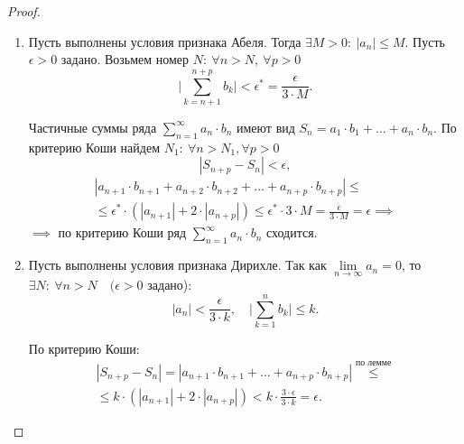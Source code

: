\begin{proof}\leavevmode
    \begin{enumerate}
        \item Пусть выполнены условия признака Абеля. Тогда $\exists M > 0: \ |a_n| \leqslant M$. Пусть $\epsilon > 0$ задано. Возьмем номер $N: \ \forall n > N, \ \forall p > 0$
              \[
                \bigg|\sum_{k=n+1}^{n+p}b_k\bigg| < \epsilon^* = \frac{\epsilon}{3\cdot M}.
              \]

              Частичные суммы ряда $\sum_{n=1}^{\infty}a_n\cdot b_n$ имеют вид $S_n = a_1\cdot b_1 + \ldots + a_n \cdot b_n$. По критерию Коши найдем $N_1: \ \forall n > N_1, \forall p > 0$
              \[
                |S_{n+p} - S_n| < \epsilon,
              \]
              \begin{multline*}
                  |a_{n+1} \cdot b_{n+1} + a_{n+2} \cdot b_{n+2} + \ldots + a_{n+p} \cdot b_{n+p}| \leqslant \\
                  \leqslant \epsilon^* \cdot (|a_{n+1}| + 2 \cdot |a_{n+p}|) \leqslant \epsilon^* \cdot 3 \cdot M = \frac{\epsilon}{3 \cdot M} = \epsilon \implies
              \end{multline*}
              $\implies$ по критерию Коши ряд $\sum_{n=1}^{\infty}a_n \cdot b_n$ сходится.

        \item Пусть выполнены условия признака Дирихле. Так как $\underset{n\rightarrow\infty}{\lim}a_n = 0$, то $\exists N: \ \forall n > N \quad (\epsilon > 0$ задано):
              \[
                |a_n| < \frac{\epsilon}{3 \cdot k}, \quad \bigg|\sum_{k=1}^{n}b_k\bigg| \leqslant k.
              \]

              По критерию Коши:
              \begin{multline*}
                  |S_{n+p} - S_n| = |a_{n+1} \cdot b_{n+1} + \ldots + a_{n+p} \cdot b_{n+p}| \overset{\text{по лемме}}{\leqslant} \\
                  \leqslant k\cdot(|a_{n+1}| + 2\cdot |a_{n+p}|) < k\cdot \frac{3\cdot \epsilon}{3 \cdot k} = \epsilon.
              \end{multline*}
    \end{enumerate}
\end{proof}

